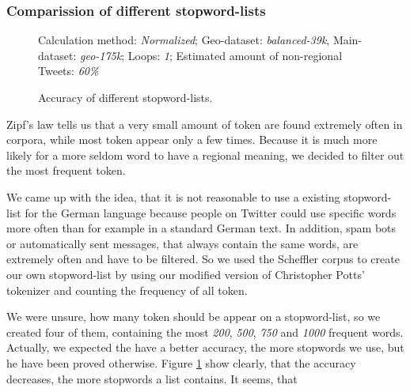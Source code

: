 \documentclass[../Main.tex]{subfiles}
\begin{document}
\subsubsection{Comparission of different stopword-lists}
\begin{figure}
\begin{center}
\end{center}
  \label{geo_graph1}
  Calculation method: \textit{Normalized}; Geo-dataset: \textit{balanced-39k}, Main-dataset: \textit{geo-175k}; Loops: \textit{1}; Estimated amount of non-regional Tweets: \textit{60\%}
  \caption{Accuracy of different stopword-lists.}

\end{figure}

Zipf's law tells us that a very small amount of token are found extremely often in corpora, while most token appear only a few times. Because it is much more likely for a more seldom word to have a regional meaning, we decided to filter out the most frequent token. 

We came up with the idea, that it is not reasonable to use a existing stopword-list for the German language because people on Twitter could use specific words more often than for example in a standard German text. In addition, spam bots or automatically sent messages, that always contain the same words, are extremely often and  have to be filtered. So we used the Scheffler corpus to create our own stopword-list by using our modified version of Christopher Potts' tokenizer and counting the frequency of all token.

We were unsure, how many token should be appear on a stopword-list, so we created four of them, containing the most \emph{200}, \emph{500}, \emph{750} and \emph{1000} frequent words.\\
Actually, we expected the have a better accuracy, the more stopwords we use, but he have been proved otherwise. 
Figure \ref{geo_graph1} show clearly, that the accuracy decreases, the more stopwords a list contains. It seems, that 
\end{document}
